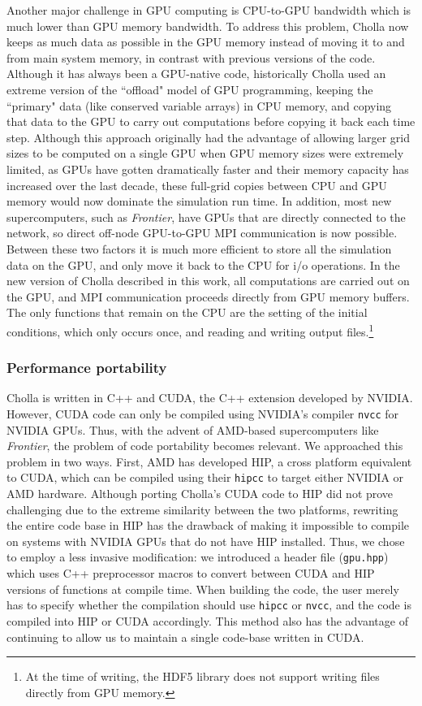 \documentclass[modern, linenumbers]{aastex631}
\begin{document}
Another major challenge in GPU computing is CPU-to-GPU bandwidth which is much lower than GPU memory bandwidth. To address this problem, Cholla now keeps as much data as possible in the GPU memory instead of moving it to and from main system memory, in contrast with previous versions of the code. Although it has always been a GPU-native code, historically Cholla used an extreme version of the ``offload" model of GPU programming, keeping the ``primary" data (like conserved variable arrays) in CPU memory, and copying that data to the GPU to carry out computations before copying it back each time step. Although this approach originally had the advantage of allowing larger grid sizes to be computed on a single GPU when GPU memory sizes were extremely limited, as GPUs have gotten dramatically faster and their memory capacity has increased over the last decade, these full-grid copies between CPU and GPU memory would now dominate the simulation run time. In addition, most new supercomputers, such as \textit{Frontier}, have GPUs that are directly connected to the network, so direct off-node GPU-to-GPU MPI communication is now possible. Between these two factors it is much more efficient to store all the simulation data on the GPU, and only move it back to the CPU for i/o operations. In the new version of Cholla described in this work, all computations are carried out on the GPU, and  MPI communication proceeds directly from GPU memory buffers. The only functions that remain on the CPU are the setting of the initial conditions, which only occurs once, and reading and writing output files.\footnote{At the time of writing, the HDF5 library does not support writing files directly from GPU memory.}

\subsubsection{Performance portability}

Cholla is written in C++ and CUDA, the C++ extension developed by NVIDIA. However, CUDA code can only be compiled using NVIDIA's compiler \texttt{nvcc} for NVIDIA GPUs. Thus, with the advent of AMD-based supercomputers like \emph{Frontier}, the problem of code portability becomes relevant. We approached this problem in two ways. First, AMD has developed HIP, a cross platform equivalent to CUDA, which can be compiled using their \texttt{hipcc} to target either NVIDIA or AMD hardware. Although porting Cholla's CUDA code to HIP did not prove challenging due to the extreme similarity between the two platforms, rewriting the entire code base in HIP has the drawback of making it impossible to compile on systems with NVIDIA GPUs that do not have HIP installed. Thus, we chose to employ a less invasive modification: we introduced a header file (\texttt{gpu.hpp}) which uses C++ preprocessor macros to convert between CUDA and HIP versions of functions at compile time. When building the code, the user merely has to specify whether the compilation should use \texttt{hipcc} or \texttt{nvcc}, and the code is compiled into HIP or CUDA accordingly. This method also has the advantage of continuing to allow us to maintain a single code-base written in CUDA.
\end{document}
